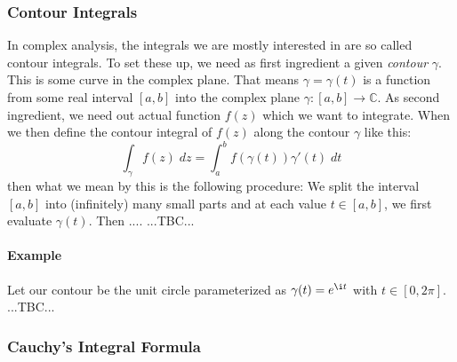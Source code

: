 

\subsubsection{Contour Integrals} 
In complex analysis, the integrals we are mostly interested in are so called contour integrals. To set these up, we need as first ingredient a given \emph{contour} $\gamma$. This is some curve in the complex plane. That means $\gamma = \gamma(t)$ is a function from some real interval $[a,b]$ into the complex plane $\gamma: [a,b] \rightarrow \mathbb{C}$. As second ingredient, we need out actual function $f(z)$ which we want to integrate. When we then define the contour integral of $f(z)$ along the contour $\gamma$ like this:
\begin{equation}
\int_{\gamma} f(z) \; dz = \int_a^b f(\gamma(t)) \gamma'(t) \; dt
\end{equation}
then what we mean by this is the following procedure: We split the interval $[a,b]$ into (infinitely) many small parts and at each value $t \in [a,b]$, we first evaluate $\gamma(t)$. Then .... ...TBC...


\paragraph{Example}
Let our contour be the unit circle parameterized as $\gamma(t) = e^{\i t}$ with $t \in [0, 2\pi]$. ...TBC...


% 





\subsubsection{Cauchy's Integral Formula}


